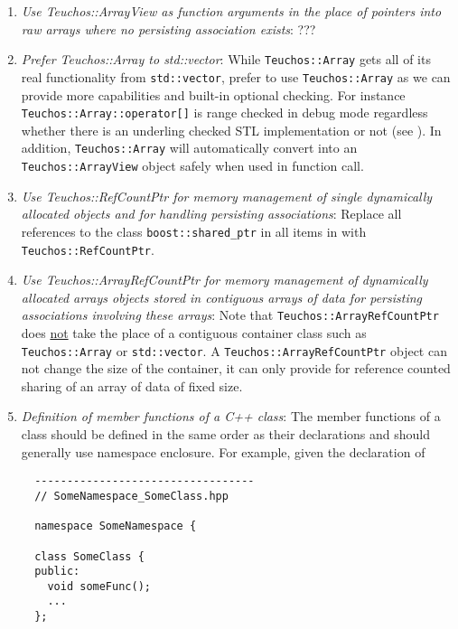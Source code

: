 \begin{enumerate}
{}\item\textit{Use Teuchos::ArrayView as function arguments in the place of
pointers into raw arrays where no persisting association exists}: ???

{}\item\textit{Prefer Teuchos::Array to std::vector}: While
{}\texttt{Teuchos::\-Array} gets all of its real functionality from
{}\texttt{std::\-vector}, prefer to use {}\texttt{Teuchos::\-Array} as we can
provide more capabilities and built-in optional checking.  For instance
{}\texttt{Teuchos::\-Array::\-operator[]} is range checked in debug mode
regardless whether there is an underling checked STL implementation or not
(see {}\cite[Item 83]{C++CodingStandards05}).  In addition,
{}\texttt{Teuchos\-::Array} will automatically convert into an
{}\texttt{Teuchos\-::ArrayView} object safely when used in function call.

{}\item\textit{Use Teuchos::RefCountPtr for memory management of single
dynamically allocated objects and for handling persisting associations}:
Replace all references to the class {}\texttt{boost::\-shared\_ptr} in all
items in {}\cite{C++CodingStandards05} with {}\texttt{Teuchos::\-RefCountPtr}.

{}\item\textit{Use Teuchos::ArrayRefCountPtr for memory management of
dynamically allocated arrays objects stored in contiguous arrays of data for
persisting associations involving these arrays}: Note that
{}\texttt{Teuchos::ArrayRefCountPtr} does {}\underline{not} take the place of
a contiguous container class such as {}\texttt{Teuchos::\-Array} or
{}\texttt{std::\-vector}.  A {}\texttt{Teuchos::ArrayRefCountPtr} object can
not change the size of the container, it can only provide for reference
counted sharing of an array of data of fixed size.

{}\item\textit{Definition of member functions of a C++ class}: The member
functions of a class should be defined in the same order as their declarations
and should generally use namespace enclosure.  For example, given the
declaration of

{\small\begin{verbatim}
  ----------------------------------
  // SomeNamespace_SomeClass.hpp

  namespace SomeNamespace {

  class SomeClass {
  public:
    void someFunc();
    ...
  };


\end{verbatim}}
\end{enumerate}
